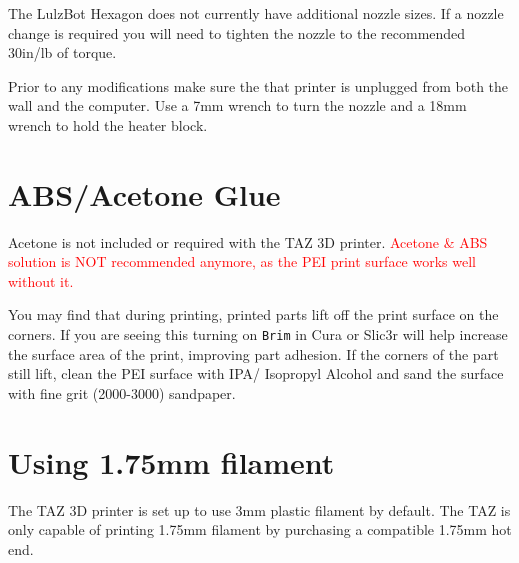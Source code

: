 The LulzBot Hexagon does not currently have additional nozzle sizes. If a nozzle change is required you will need to tighten the nozzle to the recommended 30in/lb of torque. 

Prior to any modifications make sure the that printer is unplugged from both the wall and the computer. Use a 7mm wrench to turn the nozzle and a 18mm wrench to hold the heater block. 


\section{ABS/Acetone Glue}
\label{sec:ABS/Acetone Glue}
Acetone is not included or required with the TAZ 3D printer. \textcolor{red}{Acetone & ABS solution is NOT recommended anymore, as the PEI print surface works well without it.}

You may find that during printing, printed parts lift off the print surface on the corners. If you are seeing this turning on \texttt{Brim} in Cura or Slic3r will help increase the surface area of the print, improving part adhesion. If the corners of the part still lift, clean the PEI surface with IPA/ Isopropyl Alcohol and sand the surface with fine grit (2000-3000) sandpaper.


\section{Using 1.75mm filament}

The TAZ 3D printer is set up to use 3mm plastic filament by default. The TAZ is only capable of printing 1.75mm filament by purchasing a compatible 1.75mm hot end.
